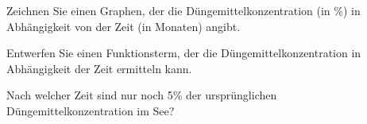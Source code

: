 \begin{bbwAufgabenBlock}

\item Zeichnen Sie einen Graphen, der die Düngemittelkonzentration (in \%)
  in Abhängigkeit von der Zeit (in Monaten) angibt.


  
    \item Entwerfen Sie einen Funktionsterm, der die
      Düngemittelkonzentration in Abhängigkeit der Zeit ermitteln
      kann.


    \item Nach welcher Zeit sind nur noch 5\% der ursprünglichen
      Düngemittelkonzentration im See?

      
\end{bbwAufgabenBlock}
\platzFuerBerechnungenBisEndeSeite{}


